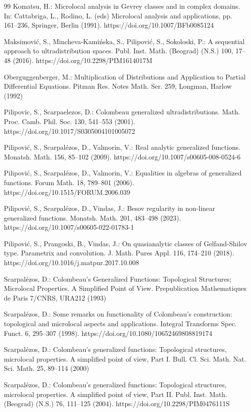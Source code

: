 \documentclass[sn-mathphys,Numbered]{sn-jnl}%
\theoremstyle{thmstyleone}%
\theoremstyle{thmstyletwo}%
\theoremstyle{thmstylethree}%
\begin{document}
\begin{thebibliography}{99}
Komatsu,  H.:  
Microlocal analysis in Gevrey classes and in complex domains.  In: Cattabriga, L., Rodino, L. (eds) Microlocal analysis and applications, pp. 161--236, Springer, Berlin (1991).
https://doi.org/10.1007/BFb0085124

Maksimovi\'c, S.,  Mincheva-Kami\' nska,  S.,  Pilipovi\'c, S.,  Sokoloski,  P.:
A sequential approach to ultradistribution spaces. 
Publ. Inst. Math. (Beograd) (N.S.) 100, 17--48  (2016).
https://doi.org/10.2298/PIM1614017M

Oberguggenberger, M.:
Multiplication of Distributions and Application to Partial Differential Equations.
Pitman Res. Notes Math. Ser. 259, Longman, Harlow (1992)

 Pilipovic,  S.,  Scarpaelezos, D.:
Colombeau generalized ultradistributions.
Math. Proc. Camb. Phil. Soc.  130,  541--553 (2001).
https://doi.org/10.1017/S0305004101005072

Pilipovi\' c,  S.,  Scarpal\' ezos, D.,  Valmorin,  V.:
Real analytic generalized functions. 
Monatsh. Math. 156,  85--102  (2009).
https://doi.org/10.1007/s00605-008-0524-6

Pilipovi\' c,  S.,  Scarpal\' ezos,  D., Valmorin,  V.:
Equalities in algebras of generalized functions.
Forum Math. 18, 789--801  (2006).
https://doi.org/10.1515/FORUM.2006.039

Pilipovi\' c,  S.,  Scarpal\' ezos,  D.,  Vindas,  J.:
Besov regularity in non-linear generalized functions.
Monatsh. Math. 201,  483--498  (2023).
https://doi.org/10.1007/s00605-022-01783-1

Pilipovi\' c,  S.,  Prangoski,  B.,  Vindas,  J.:
On quasianalytic classes of Gelfand-Shilov type. Parametrix and convolution.
J. Math. Pures Appl.  116, 174--210   (2018).
https://doi.org/10.1016/j.matpur.2017.10.008

Scarpal\' ezos,  D.:
Colombeau's Generalized Functions: Topological Structures; Microlocal Properties. A Simplified Point of View.
Prepublication Mathematiques de Paris 7/CNRS, URA212 (1993)

Scarpal\' ezos,  D.:
Some remarks on functionality of Colombeau's construction: topological and microlocal aspects and applications.
Integral Transforms Spec.  Funct. 6,  295--307  (1998).
https://doi.org/10.1080/10652469808819174

Scarpal\' ezos,  D.:
Colombeau's generalized functions: Topological structures, microlocal properties. A simplified point of view, Part I. 
Bull. Cl. Sci. Math. Nat. Sci. Math.  25,  89--114  (2000)

Scarpal\' ezos,  D.:
Colombeau's generalized functions: Topological structures, microlocal properties. A simplified point of view, Part II. 
Publ. Inst. Math. (Beograd) (N.S.) 76, 111--125  (2004).
https://doi.org/10.2298/PIM0476111S

\end{thebibliography}


\end{document}
